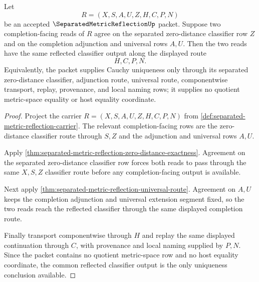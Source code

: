 \begin{theorem}
\label{thm:separated-metric-reflection-cauchy-uniqueness}
Let
$$
R=(X,S,A,U,Z,H,C,P,N)
$$
be an accepted $\SeparatedMetricReflectionUp$ packet. Suppose two completion-facing reads of $R$ agree on the separated zero-distance classifier row $Z$ and on the completion adjunction and universal rows $A,U$. Then the two reads have the same reflected classifier output along the displayed route
$$
H,C,P,N .
$$
Equivalently, the packet supplies Cauchy uniqueness only through its separated zero-distance classifier, adjunction route, universal route, componentwise transport, replay, provenance, and local naming rows; it supplies no quotient metric-space equality or host equality coordinate.
\end{theorem}
\begin{proof}
Project the carrier $R=(X,S,A,U,Z,H,C,P,N)$ from \autoref{def:separated-metric-reflection-carrier}. The relevant completion-facing rows are the zero-distance classifier route through $S,Z$ and the adjunction and universal rows $A,U$.

Apply \autoref{thm:separated-metric-reflection-zero-distance-exactness}. Agreement on the separated zero-distance classifier row forces both reads to pass through the same $X,S,Z$ classifier route before any completion-facing output is available.

Next apply \autoref{thm:separated-metric-reflection-universal-route}. Agreement on $A,U$ keeps the completion adjunction and universal extension segment fixed, so the two reads reach the reflected classifier through the same displayed completion route.

Finally transport componentwise through $H$ and replay the same displayed continuation through $C$, with provenance and local naming supplied by $P,N$. Since the packet contains no quotient metric-space row and no host equality coordinate, the common reflected classifier output is the only uniqueness conclusion available.
\end{proof}

